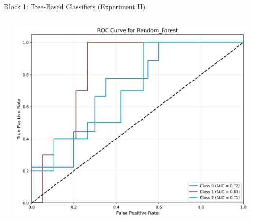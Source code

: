 \documentclass[9pt]{beamer}
\begin{document}
\begin{frame}{Block 1: Tree-Based Classifiers (Experiment II)}
\begin{columns}
\begin{column}{0.33\textwidth}
        \end{column}
        \begin{column}{0.33\textwidth}
            \centering
            \includegraphics[width=\textwidth]{code/ResultsMainAugZip/plots/Block1_Tree_Based_Experiment_II/roc_curve_Random_Forest.png}
        \end{column}
    \end{columns}
    \end{frame}
    
\end{document}
